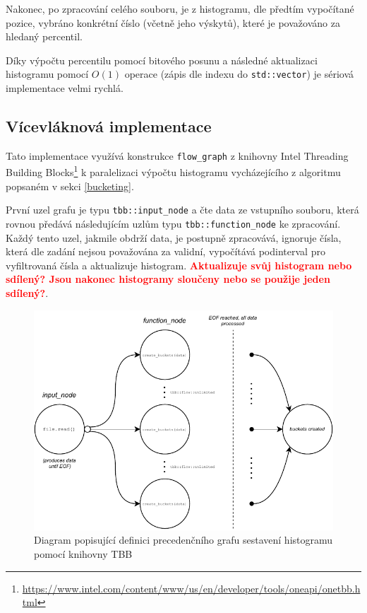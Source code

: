 \documentclass[12pt, a4paper]{article}
\begin{document}
Nakonec, po zpracování celého souboru, je z histogramu, dle předtím vypočítané pozice, vybráno konkrétní číslo (včetně jeho výskytů), které je považováno za hledaný percentil.

Díky výpočtu percentilu pomocí bitového posunu a následné aktualizaci histogramu pomocí $O(1)$ operace (zápis dle indexu do \texttt{std::vector}) je sériová implementace velmi rychlá.

\subsection{Vícevláknová implementace}
Tato implementace využívá konstrukce \texttt{flow\_graph} z knihovny Intel Threading Building Blocks\footnote{\url{https://www.intel.com/content/www/us/en/developer/tools/oneapi/onetbb.html}} k paralelizaci výpočtu histogramu vycházejícího z algoritmu popsaném v sekci \ref{bucketing}.

První uzel grafu je typu \texttt{tbb::input\_node} a čte data ze vstupního souboru, která rovnou předává následujícím uzlům typu \texttt{tbb::function\_node} ke zpracování.
Každý tento uzel, jakmile obdrží data, je postupně zpracovává, ignoruje čísla, která dle zadání nejsou považována za validní, vypočítává podinterval pro vyfiltrovaná čísla a aktualizuje histogram. \textcolor{red}{\textbf{Aktualizuje svůj histogram nebo sdílený? Jsou nakonec histogramy sloučeny nebo se použije jeden sdílený?}}. 

\begin{figure}[!ht]
    \centering 
    \includegraphics[width=1.0\textwidth]{pdf/create-buckets-tbb.pdf}
    \caption{Diagram popisující definici precedenčního grafu sestavení histogramu pomocí knihovny TBB}
\end{figure}
\end{document}
